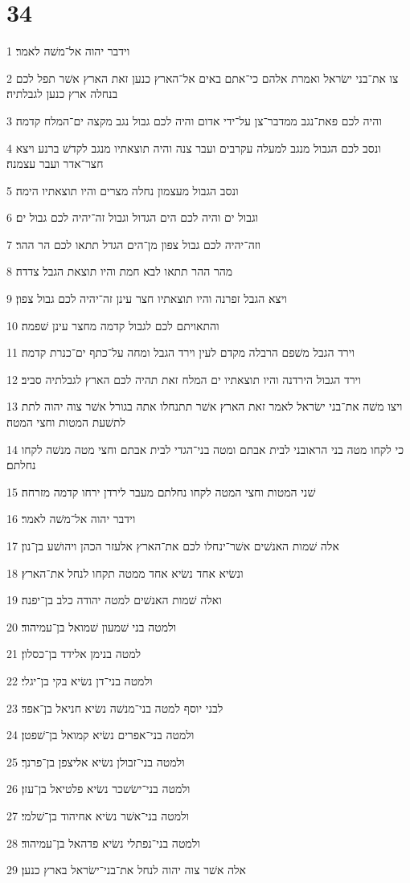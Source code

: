 \chapter{34}

\par 1 וידבר יהוה אל־משׁה לאמר׃
\par 2 צו את־בני ישׂראל ואמרת אלהם כי־אתם באים אל־הארץ כנען זאת הארץ אשׁר תפל לכם בנחלה ארץ כנען לגבלתיה׃
\par 3 והיה לכם פאת־נגב ממדבר־צן על־ידי אדום והיה לכם גבול נגב מקצה ים־המלח קדמה׃
\par 4 ונסב לכם הגבול מנגב למעלה עקרבים ועבר צנה והיה תוצאתיו מנגב לקדשׁ ברנע ויצא חצר־אדר ועבר עצמנה׃
\par 5 ונסב הגבול מעצמון נחלה מצרים והיו תוצאתיו הימה׃
\par 6 וגבול ים והיה לכם הים הגדול וגבול זה־יהיה לכם גבול ים׃
\par 7 וזה־יהיה לכם גבול צפון מן־הים הגדל תתאו לכם הר ההר׃
\par 8 מהר ההר תתאו לבא חמת והיו תוצאת הגבל צדדה׃
\par 9 ויצא הגבל זפרנה והיו תוצאתיו חצר עינן זה־יהיה לכם גבול צפון׃
\par 10 והתאויתם לכם לגבול קדמה מחצר עינן שׁפמה׃
\par 11 וירד הגבל משׁפם הרבלה מקדם לעין וירד הגבל ומחה על־כתף ים־כנרת קדמה׃
\par 12 וירד הגבול הירדנה והיו תוצאתיו ים המלח זאת תהיה לכם הארץ לגבלתיה סביב׃
\par 13 ויצו משׁה את־בני ישׂראל לאמר זאת הארץ אשׁר תתנחלו אתה בגורל אשׁר צוה יהוה לתת לתשׁעת המטות וחצי המטה׃
\par 14 כי לקחו מטה בני הראובני לבית אבתם ומטה בני־הגדי לבית אבתם וחצי מטה מנשׁה לקחו נחלתם׃
\par 15 שׁני המטות וחצי המטה לקחו נחלתם מעבר לירדן ירחו קדמה מזרחה׃
\par 16 וידבר יהוה אל־משׁה לאמר׃
\par 17 אלה שׁמות האנשׁים אשׁר־ינחלו לכם את־הארץ אלעזר הכהן ויהושׁע בן־נון׃
\par 18 ונשׂיא אחד נשׂיא אחד ממטה תקחו לנחל את־הארץ׃
\par 19 ואלה שׁמות האנשׁים למטה יהודה כלב בן־יפנה׃
\par 20 ולמטה בני שׁמעון שׁמואל בן־עמיהוד׃
\par 21 למטה בנימן אלידד בן־כסלון׃
\par 22 ולמטה בני־דן נשׂיא בקי בן־יגלי׃
\par 23 לבני יוסף למטה בני־מנשׁה נשׂיא חניאל בן־אפד׃
\par 24 ולמטה בני־אפרים נשׂיא קמואל בן־שׁפטן׃
\par 25 ולמטה בני־זבולן נשׂיא אליצפן בן־פרנך׃
\par 26 ולמטה בני־ישׂשכר נשׂיא פלטיאל בן־עזן׃
\par 27 ולמטה בני־אשׁר נשׂיא אחיהוד בן־שׁלמי׃
\par 28 ולמטה בני־נפתלי נשׂיא פדהאל בן־עמיהוד׃
\par 29 אלה אשׁר צוה יהוה לנחל את־בני־ישׂראל בארץ כנען׃

